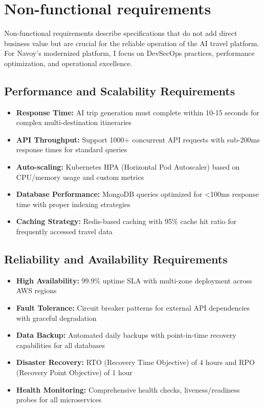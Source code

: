 \section{Non-functional requirements}
Non-functional requirements describe specifications that do not add direct business value but are crucial for the reliable operation of the AI travel platform.
For Navoy's modernized platform, I focus on DevSecOps practices, performance optimization, and operational excellence.

\subsection{Performance and Scalability Requirements}
\begin{itemize}
    \item \textbf{Response Time:} AI trip generation must complete within 10-15 seconds for complex multi-destination itineraries
    \item \textbf{API Throughput:} Support 1000+ concurrent API requests with sub-200ms response times for standard queries
    \item \textbf{Auto-scaling:} Kubernetes HPA (Horizontal Pod Autoscaler) based on CPU/memory usage and custom metrics
    \item \textbf{Database Performance:} MongoDB queries optimized for <100ms response time with proper indexing strategies
    \item \textbf{Caching Strategy:} Redis-based caching with 95\% cache hit ratio for frequently accessed travel data
\end{itemize}

\subsection{Reliability and Availability Requirements}
\begin{itemize}
    \item \textbf{High Availability:} 99.9\% uptime SLA with multi-zone deployment across AWS regions
    \item \textbf{Fault Tolerance:} Circuit breaker patterns for external API dependencies with graceful degradation
    \item \textbf{Data Backup:} Automated daily backups with point-in-time recovery capabilities for all databases
    \item \textbf{Disaster Recovery:} RTO (Recovery Time Objective) of 4 hours and RPO (Recovery Point Objective) of 1 hour
    \item \textbf{Health Monitoring:} Comprehensive health checks, liveness/readiness probes for all microservices
\end{itemize}

